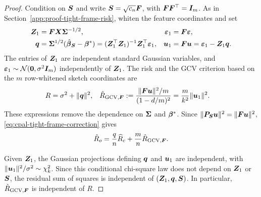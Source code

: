\documentclass{article}
\theoremstyle{plain} %
\theoremstyle{definition} %
\theoremstyle{definition} %
\newcommand{\GCV}{{\text{GCV}}}
\newcommand{\hR}{\hat{R}}
\begin{document}
\begin{proof}
Condition on $\boldsymbol{S}$ and write $\boldsymbol{S}=\sqrt{c_n}\boldsymbol{F}$, with
$\boldsymbol{F}\boldsymbol{F}^\top=\boldsymbol{I}_m$. As in
Section~\ref{app:proof-tight-frame-risk}, whiten the feature coordinates and set
\begin{align*}
    \boldsymbol{Z}_1&=\boldsymbol{F}\boldsymbol{X}\boldsymbol{\Sigma}^{-1/2},
    &{\boldsymbol{\varepsilon} }_1&=\boldsymbol{F}{\boldsymbol{\varepsilon} },\\
    \boldsymbol{q}&=\boldsymbol{\Sigma}^{1/2}(\hat{\boldsymbol{\beta}}{}_{\boldsymbol{S}}-\boldsymbol{\beta}^*)
       =(\boldsymbol{Z}_1^\top\boldsymbol{Z}_1)^{-1}\boldsymbol{Z}_1^\top{\boldsymbol{\varepsilon} }_1,
    &\boldsymbol{u}_1&=\boldsymbol{F}\boldsymbol{u}={\boldsymbol{\varepsilon} }_1-\boldsymbol{Z}_1\boldsymbol{q}.
\end{align*}
The entries of $\boldsymbol{Z}_1$ are independent standard Gaussian variables, and
${\boldsymbol{\varepsilon} }_1\sim{\mathcal N}(\mathbf{0},\sigma^2\boldsymbol{I}_m)$ independently of $\boldsymbol{Z}_1$.
The risk and the GCV criterion based on the $m$ row-whitened sketch
coordinates are
\begin{align*}
    R&=\sigma^2+\norm{\bq}^2,
    &\hR_{\GCV,\bF}
    &:=\frac{\norm{\bF\bu}^2/m}{(1-d/m)^2}
      =\frac{m}{k^2}\norm{\bu_1}^2.
\end{align*}
These expressions remove the dependence on $\boldsymbol{\Sigma}$ and $\boldsymbol{\beta}^*$.
Since $\lVert\boldsymbol{P}_{\boldsymbol{S}}\boldsymbol{u}\rVert^2=\lVert\boldsymbol{F}\boldsymbol{u}\rVert^2$,
\eqref{eq:cpal-tight-frame-correction} gives
\begin{align}
    \hR_o=\frac qn\widehat R_c+\frac mn\hR_{\GCV,\bF}.
    \label{eq:tight-frame-R-obs-pooled-decomposition}
\end{align}

Given $\boldsymbol{Z}_1$, the Gaussian projections defining $\boldsymbol{q}$ and
$\boldsymbol{u}_1$ are independent, with
$\lVert\boldsymbol{u}_1\rVert^2/\sigma^2\sim\chi^2_k$. Since this conditional chi-square
law does not depend on $\boldsymbol{Z}_1$ or $\boldsymbol{S}$, the residual sum of squares is
independent of $(\boldsymbol{Z}_1,\boldsymbol{q},\boldsymbol{S})$. In particular,
$\hR_{\GCV,\bF}$ is independent of $R$.


\end{proof}
\end{document}
